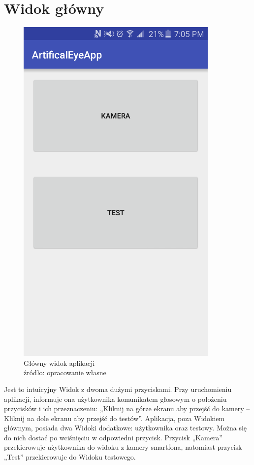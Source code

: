 \documentclass[eng,oneside]{mgr}
\begin{document}
\section {Widok główny}
\begin{figure}[htbp]
\centering
\includegraphics{glownywidok.png}
\renewcommand\figurename{Przykład}
\caption{Główny widok aplikacji
\\ 
źródło: opracowanie własne}\par\medskip

\end{figure}
Jest to intuicyjny Widok z dwoma dużymi przyciskami. Przy uruchomieniu aplikacji, informuje ona użytkownika komunikatem głosowym o położeniu przycisków i ich przeznaczeniu: „Kliknij na górze ekranu aby przejść do kamery – Kliknij na dole ekranu aby przejść do testów”. Aplikacja, poza Widokiem głównym, posiada dwa Widoki dodatkowe: użytkownika oraz testowy. Można się do nich dostać po wciśnięciu w odpowiedni przycisk. Przycisk „Kamera” przekierowuje użytkownika do widoku z kamery smartfona, natomiast przycisk „Test” przekierowuje do Widoku testowego.
\end{document}
